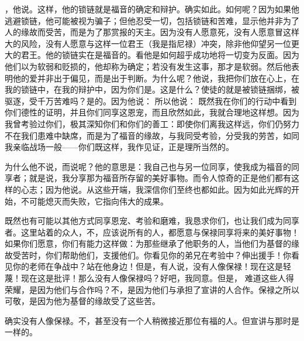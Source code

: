 ，他说。这样，他的锁链就是福音的确定和辩护。确实如此。如何呢？因为如果他逃避锁链，他可能被视为骗子；但他忍受一切，包括锁链和苦难，显示他并非为了人的缘故而受苦，而是为了那赏报的天主。因为没有人愿意死，没有人愿意冒这样大的风险，没有人愿意与这样一位君王（我是指尼禄）冲突，除非他仰望另一位更大的君王。他的锁链实在是福音的。看他是如何超乎成功地将一切变为反面。因为他们以为软弱和贬损的，他却称为确定；若没有发生这事，那才是软弱。然后他表明他的爱并非出于偏见，而是出于判断。为什么呢？他说，我把你们放在心上，在我的锁链中，在我的辩护中，因为你们是。这是什么？使徒的就是被锁链捆绑，被驱逐，受千万苦难吗？是的。因为他说：  所以他说：  既然我在你们的行动中看到你们德性的证明，并且你们同享这恩宠，而且欣然如此，我就合理地这样想。因为我曾考验过你们，极其深知你们和你们的善工：即使你们离我这样远，你们仍努力不在我们患难中缺席，而是为了福音的缘故，与我同受考验，分受我的劳苦，如同我亲临战场一般——你们既这样，我作见证，正是理所当然的。\par

为什么他不说，而说呢？他的意思是：我自己也与另一位同享，使我成为福音的同享者；就是说，我分享那为福音所存留的美好事物。而令人惊奇的正是他们都有这样的心志；因为他说。从这些开端，我深信你们至终也都如此。因为如此光辉的开始，不可能熄灭而失败，它指向伟大的成果。\par

既然也有可能以其他方式同享恩宠、考验和磨难，我恳求你们，也让我们成为同享者。这里站着的众人，不，应该说所有的人，都愿意与保禄同享将来的美好事物！如果你们愿意，你们有能力这样做：为那些继承了他职务的人，当他们为基督的缘故受苦时，你们帮助他们，支援他们。你看见你的弟兄在考验中？伸出援手！你看见你的老师在争战中？站在他身边！但是，有人说，没有人像保禄！现在这是轻蔑！现在这是批评！那么没有人像保禄吗？好吧，我同意。但是，  难道这些人得荣耀，是因为他们与合作吗？不，是因为他们与承担了宣讲的人合作。保禄之所以可敬，是因为他为基督的缘故受了这些苦。\par

确实没有人像保禄。不，甚至没有一个人稍微接近那位有福的人。但宣讲与那时是一样的。\par

